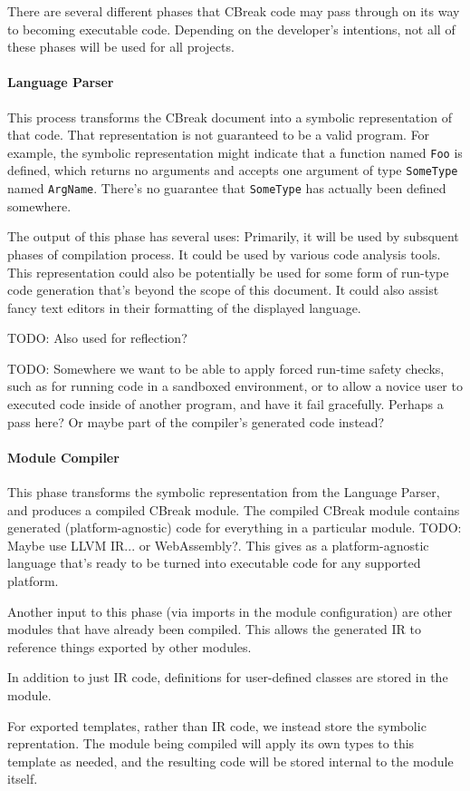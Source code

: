 \documentclass{article}
\newcommand{\code}[1]{\colorbox{light-gray}{\texttt{#1}}}
\newcommand{\breakingparagraph}[1]{\paragraph{#1}\mbox{}\medbreak}
\begin{document}
There are several different phases that CBreak code may pass through on its way to becoming executable code.  Depending on the developer's intentions, not all of these phases will be used for all projects.

\breakingparagraph{Language Parser}

This process transforms the CBreak document into a symbolic representation of that code.  That representation is not guaranteed to be a valid program.  For example, the symbolic representation might indicate that a function named \code{Foo} is defined, which returns no arguments and accepts one argument of type \code{SomeType} named \code{ArgName}.  There's no guarantee that \code{SomeType} has actually been defined somewhere.

The output of this phase has several uses: Primarily, it will be used by subsquent phases of compilation process.  It could be used by various code analysis tools.  This representation could also be potentially be used for some form of run-type code generation that's beyond the scope of this document.  It could also assist fancy text editors in their formatting of the displayed language.  

TODO: Also used for reflection?

TODO: Somewhere we want to be able to apply forced run-time safety checks, such as for running code in a sandboxed environment, or to allow a novice user to executed code inside of another program, and have it fail gracefully.  Perhaps a pass here?  Or maybe part of the compiler's generated code instead?

\breakingparagraph{Module Compiler}

This phase transforms the symbolic representation from the Language Parser, and produces a compiled CBreak module.  The compiled CBreak module contains generated (platform-agnostic) code for everything in a particular module.  TODO: Maybe use LLVM IR... or WebAssembly?.  This gives as a platform-agnostic language that's ready to be turned into executable code for any supported platform.

Another input to this phase (via imports in the module configuration) are other modules that have already been compiled.  This allows the generated IR to reference things exported by other modules.

In addition to just IR code, definitions for user-defined classes are stored in the module.

For exported templates, rather than IR code, we instead store the symbolic reprentation.  The module being compiled will apply its own types to this template as needed, and the resulting code will be stored internal to the module itself.
\end{document}
